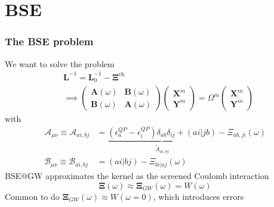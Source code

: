 \documentclass{beamer}
\begin{document}
\section{BSE}
\begin{frame}
    \frametitle{The BSE problem}
We want to solve the problem
\begin{align}
&\bm{L}^{-1} = \bm{L}_0^{-1} - \bm{\Xi}^{\mathrm{eh}} \\
        &\implies \begin{pmatrix}
        \mathcal{\bm{A}}(\omega ) & \mathcal{\bm{B}}(\omega ) \\
        \mathcal{\bm{B}}(\omega ) & \mathcal{\bm{A}}(\omega )
    \end{pmatrix}
\begin{pmatrix}
    \bm{X}^m \\
\bm{Y}^m
\end{pmatrix}
=
\Omega ^m
\begin{pmatrix}
    \bm{X}^m \\
\bm{Y}^m
\end{pmatrix}
\end{align}
with
\begin{align}
\label{a}
\mathcal{A}_{\mu \nu} \equiv \mathcal{A}_{ai,bj} &= \underbrace{\left( \epsilon_a^{QP} - \epsilon_i^{QP} \right) \delta_{ab} \delta_{ij} + (ai|jb)}_{\tilde{A}_{ai,bj}} - {\Xi}_{ab,ji}(\omega) \\
\mathcal{B}_{\mu \nu} \equiv \mathcal{B}_{ai,bj} &= (ai|bj) - {\Xi}_{bi|aj}(\omega)
\end{align}
 BSE@GW approximates the kernel as the screened Coulomb interaction
\begin{equation}
    \bm{\Xi}(\omega ) \approx \bm{\Xi}_{GW}(\omega ) = W(\omega )
\end{equation}
Common to do $\bm{\Xi}_{GW}(\omega ) \approx W(\omega=0)$, which introduces errors
\end{frame}
\end{document}
